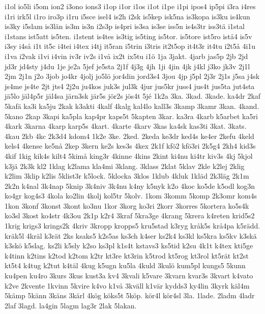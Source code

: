 {{i1ol
io5li
i5om
ion2
i3ono
ions3
i1op
i1or
i1os
i1ot
i1pe
i1pi
ipos4
ip5pi
i3ra
i4res
i1ri
irk5l
i1ro
iro3p
i1ru
i5sce
isel4
is2h
i2sk
is5kep
isk5na
is3kopa
is3ku
is4kun
is3ky
i5slam
is3l^^e4n
is3m
is3n
i2s3p
is4pri
is3sa
is3se
iss5n
is4s3tr
iss3t^^e4
i1stal
i1stans
ist5att
is5ten.
i1stent
is4tes
is3tig
is5ting
is5tor.
is5tore
ist5ro
ist^^e54
is5v
i3sy
i4s^^e5
i1t
it5c
i4tei
i4tex
i4tj
it5ran
i5trin
i3tris
it2t5op
it4t3r
it4tu
i2t5^^e5
4i1u
i1va
i2vak
i1vi
i4vin
iv3r
iv2s
i1v^^e5
ix2t
ix5tu
i1^^f6
1ja
3jakt.
4jarb
jas5p
2jb
2jd
jd3r
jd4sty
j4du
1je
je2a
5jef
je5sta
2j1f
4j3g
4jh
1ji
4jin
4jk
j4kl
j3ko
jk3v
2j1l
2jm
2j1n
j2o
3job
jo4kr
4jolj
jo5l^^f6
jor4din
jord3s4
3jou
4jp
j5pl
2j3r
2j1s
j5sa
j4sk
js4me
js4te
2jt
jts4
2j2u
ju4kos
juk3s
jul3k
4jur
jus5kr
juss4
jus4t
jus5ta
jut4sta
j^^e45lo
j^^e4l4p5r
j^^e4l4sa
j^^e4rn3sk
j^^e4r5s
j^^f6r2s
j^^f6s4t
5j^^e9
1k2a
3ka.
3kad.
3kade.
ka4dr
2kaf
5kaf^^e4
ka3i
ka5ju
2kak
k3akti
4kalf
4kalg
kal4lo
kall3s
3kamp
3kamr
3kan.
4kand.
5kano
2kap
3kapi
ka5pla
kap4pr
kaps5t
5kapten
3kar.
ka3ra
4karb
k5arbet
ka5ri
4kark
3karna
4karp
karp5s
4kart.
4karte
4karv
3kas
ka4sk
kas3ti
3kat.
3kats.
4kau
2kb
4kc
2k3d4
kdom4
1k2e
3ke.
2ked.
2keda
ke3dr
ked4s
ke4er
2kefu
4keld
kels4
4kense
ke5n^^e5
2kep
3kern
ke2s
kes3s
4kex
2k1f
kf^^f62
kf^^f63ri
2k5g4
2kh4
kid3s
4kif
1kig
kik4s
kilt4
5kim^^e5
king3r
4kinne
4kins
2kint
ki4nu
ki4tr
kiv3s
4kj
5kjol
k3j^^e4
2k3k
kl2
1klag
k2lama
kla4mi
3klang.
3klass
2klat
5klav
2kle
k2lej
2klig
k2lim
3klip
k2lis
5klist3r
k5lock.
5klocka
3klos
1klub
4kluk
1kl^^e4d
2k3l^^e4g
2k1m
2k2n
k4nal
3k4nap
5knip
3k4niv
3k4nu
k4ny
k5nyk
k2o
4koc
ko5de
k5odl
kog3n
ko4gr
kog4s3
4kola
ko2lin
4kolj
kol5tr
5kolv.
1kom
3komm
5komp
2k3omr
kom4s
1kon
3konf
3konst
3kont
ko3nu
1kor
3korg
ko3ri
2korr
3korres
5kortera
ko5s4k
ko3sl
3kost
ko4str
4k3ou
2k1p
k2r4
3kraf
5kra3ge
4krang
5krera
k4reten
krid5s2
1krig
krigs3
krings2k
4kriv
3kropp
kropps5
kru5stad
k3ryg
kr^^e5k5s
kr^^e54pa
k5r^^e4dd.
kr^^e4k5l
4kr^^e4l
k3r^^e4t
2ks
ksaks5
k2s5as
ks3ch
k4ser
ks2k4
ks3kl
ks5kra
ks5kv
k3sk^^e4
k3sk^^f6
k5slag.
ks2li
k5sly
k2so
ks3pl
k1s4t
kstavs3
ks5tid
k2su
4k1t
k4tex
kti5ge
k4tinn
k2tins
k2tod
k2tom
k2tr
kt3re
kt3rin
k5trod
kt5rog
kt3rol
kt5r^^e4t
kt2st
kt5t4
k4tug
k2tut
k4t^^e4l
4kug
k5ugn
ku5la
4kuld
3kul^^f6
kum5pl
kungs5
5kunn
ku4pen
ku4ro
3kurs
3kus
kust3a
kv4
3kvali
k5vare
3kvarn
kvar3s
3kvart
k4vato
k2ve
2kvente
1kvinn
5kvire
k4vo
k1v^^e5
3kv^^e4ll
k1v^^e4r
kydds3
ky4lin
3kyrk
k^^e4l4m
5k^^e4mp
5k^^e4nn
3k^^e4ns
3k^^e4rl
4k^^f6g
k^^f6ks5t
5k^^f6p.
k^^f6r4l
k^^f6r4sl
3la.
1lade.
2ladm
4ladr
2laf
3lagd.
la4gin
5lagm
lag3r
2lak
5lakan.
}}

